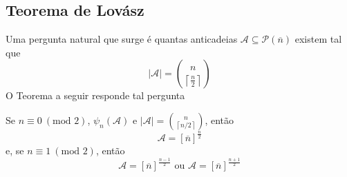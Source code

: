 \documentclass[11pt]{article}
\newcommand{\mc}[1]{\mathcal{#1}}
\newcommand{\ol}[1]{\overline{#1}}
\newcommand\ceil[1]{{\left\lceil#1\right\rceil}}
\begin{document}
\subsection{Teorema de Lovász}

Uma pergunta natural que surge é quantas anticadeias $\mathscr{A}\subseteq\mc{P}(\ol{n})$ existem tal que
$$|\mathscr{A}|=\binom{n}{\ceil{\frac{n}{2}}}$$
O Teorema a seguir responde tal pergunta

\begin{shaded}
\begin{theorem}
    Se $n\equiv0~(\text{mod }2)$, $\psi_n(\mathscr{A})$ e $|\mathscr{A}|=\binom{n}{\ceil{n/2}}$, então
    $$\mathscr{A}=[\ol{n}]^{\frac{n}{2}}$$
    e, se $n\equiv1~(\text{mod }2)$, então
    $$\mathscr{A}=[\ol{n}]^{\frac{n-1}{2}}\text{ ou }\mathscr{A}=[\ol{n}]^{\frac{n+1}{2}}$$
\end{theorem}
\end{shaded}
\end{document}
